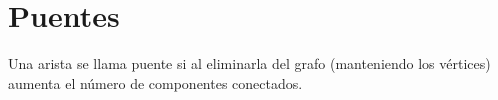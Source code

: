 \section{Puentes}\label{bridges}
Una arista se llama puente si al eliminarla del grafo (manteniendo los vértices) aumenta el número de componentes conectados.
